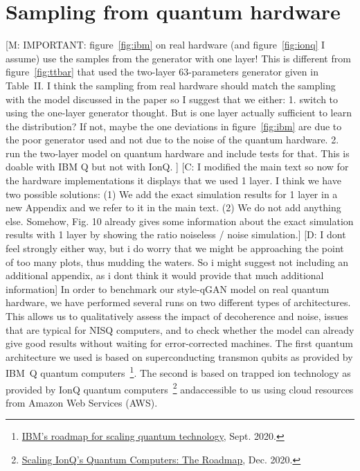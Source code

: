 \documentclass[twocolumn,preprintnumbers,superscriptaddress]{revtex4-2}
\newcommand{\commentCBP}[1]{{\color{red} {[C: #1]}}}
\newcommand{\commentMC}[1]{{\color{magenta} {[M: #1]}}}
\newcommand{\commentDMG}[1]{{\color{orange} {[D: #1]}}}
\begin{document}
\section{Sampling from quantum hardware}
\label{sec:deployment}

\commentMC{IMPORTANT: figure~\ref{fig:ibm} on real hardware (and figure~\ref{fig:ionq} I assume) use the samples from the generator with one layer! This is different from figure~\ref{fig:ttbar} that used the two-layer 63-parameters generator given in Table~II.
I think the sampling from real hardware should match the sampling with the model discussed in the paper so I suggest that we either:
1. switch to using the one-layer generator thought. But is one layer actually sufficient to learn the distribution? If not, maybe the one deviations in figure~\ref{fig:ibm} are due to the poor generator used and not due to the noise of the quantum hardware.
2. run the two-layer model on quantum hardware and include tests for that. This is doable with IBM Q but not with IonQ.
} \commentCBP{I modified the main text so now for the hardware implementations it displays that we used 1 layer. I think we have two possible solutions: (1) We add the exact simulation results for 1 layer in a new Appendix and we refer to it in the main text. (2) We do not add anything else. Somehow, Fig. 10 already gives some information about the exact simulation results with 1 layer by showing the ratio noiseless / noise simulation.}\commentDMG{I dont feel strongly either way, but i do worry that we might be approaching the point of too many plots, thus mudding the waters. So i might suggest not including an additional appendix, as i dont think it would provide that much additional information}
In order to benchmark our style-qGAN model on real quantum hardware, we
have performed several runs on two different types of
architectures. This allows us to qualitatively assess the impact of
decoherence and noise, issues that are typical for NISQ computers, and
to check whether the model can already give good results without
waiting for error-corrected machines. The first quantum architecture we used is based on
superconducting transmon qubits as provided by IBM~Q
quantum computers~\footnote{\href{https://research.ibm.com/blog/ibm-quantum-roadmap}{IBM's roadmap for scaling quantum technology}, Sept. 2020.}.
The second is based on trapped ion technology as provided by IonQ quantum computers~\footnote{\href{https://IonQ.com/posts/december-09-2020-scaling-quantum-computer-roadmap}{Scaling IonQ's Quantum Computers: The Roadmap}, Dec. 2020.}
andaccessible to us using cloud resources from Amazon Web Services (AWS).
\end{document}
